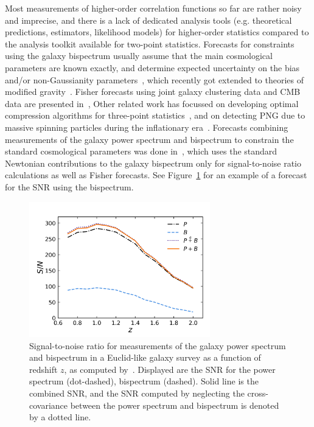 Most measurements of higher-order correlation functions so far are rather noisy and imprecise, and there is a lack of dedicated analysis tools (e.g. theoretical predictions, estimators, likelihood models) for higher-order statistics compared to the analysis toolkit available for two-point statistics. Forecasts for constraints using the galaxy bispectrum usually assume that the main cosmological parameters are known exactly, and determine expected uncertainty on the bias and/or non-Gaussianity parameters~\cite{Scoccimarro:2003wn,Sefusatti:2007ih,Song:2015gca,Tellarini:2016sgp,Yamauchi:2016wuc,Karagiannis:2018jdt}, which recently got extended to theories of modified gravity~\cite{Yamauchi:2017ibz}. Fisher forecasts using joint galaxy clustering data and CMB data are presented in~\cite{Sefusatti:2006pa}, Other related work has focussed on developing optimal compression algorithms for three-point statistics~\cite{Byun:2017fkz,Gualdi:2018pyw}, and on detecting PNG due to massive spinning particles during the inflationary era~\cite{MoradinezhadDizgah:2018ssw}. Forecasts combining measurements of the galaxy power spectrum and bispectrum to constrain the standard cosmological parameters was done in~\cite{Yankelevich:2018uaz}, which uses the standard Newtonian contributions to the galaxy bispectrum only for signal-to-noise ratio calculations as well as Fisher forecasts. See Figure~\ref{fig:snr_yp} for an example of a forecast for the SNR using the bispectrum.

\begin{figure}[!ht]
	\centering
	\includegraphics[width=0.7\textwidth]{fig/ypsnr.png}
	\caption{Signal-to-noise ratio for measurements of the galaxy power spectrum and bispectrum in a Euclid-like galaxy survey as a function of redshift $z$, as computed by~\cite{Yankelevich:2018uaz}. Displayed are the SNR for the power spectrum (dot-dashed), bispectrum (dashed). Solid line is the combined SNR, and the SNR computed by neglecting the cross-covariance between the power spectrum and bispectrum is denoted by a dotted line.}
	\label{fig:snr_yp}
\end{figure}

